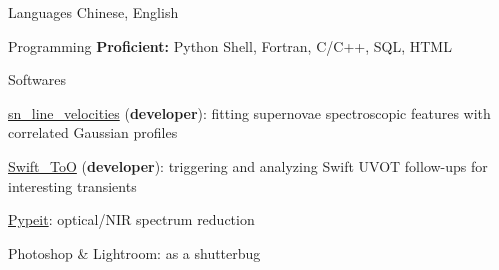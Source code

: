 


\begin{cvskills}


\cvskill
{Languages} %
{Chinese, English} %


\cvskill
{Programming} %
{{\bf\color{darktext}Proficient:} Python Shell, Fortran, C/C++, SQL, HTML} %



\cvskill
{Softwares} %
{\begin{cvitems}
    \item {\href{https://github.com/slowdivePTG/sn_line_velocities}{sn\_line\_velocities} ({\bf\color{darktext}developer}): fitting supernovae spectroscopic features with correlated Gaussian profiles}
    \item {\href{https://github.com/slowdivePTG/Swift_ToO}{Swift\_ToO} ({\bf\color{darktext}developer}): triggering and analyzing Swift UVOT follow-ups for interesting transients}
    \item \href{https://pypeit.readthedocs.io/en/release/}{Pypeit}: optical/NIR spectrum reduction
    \item Photoshop \& Lightroom: as a shutterbug
\end{cvitems}}%

\end{cvskills}